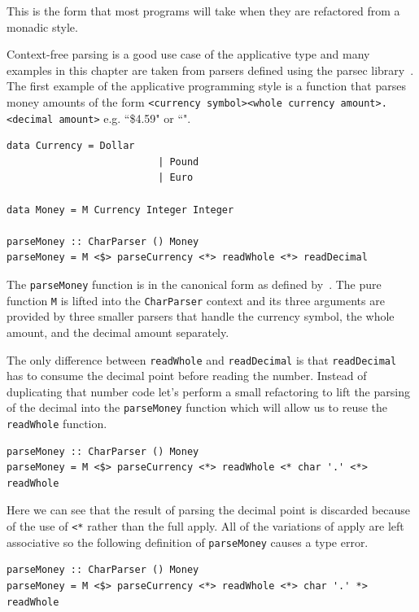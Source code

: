 This is the form that most programs will take when they are refactored from a monadic style. 


 Context-free parsing is a good use case of the applicative type and many examples in this chapter are taken from parsers defined using the parsec library~\citep{parsec}. The first example of the applicative programming style is a function that parses money amounts of the form \texttt{<currency symbol><whole currency amount>.<decimal amount>} e.g. ``\$4.59" or ``".
 
 \begin{lstlisting}[frame=tblr]
 data Currency = Dollar
                          | Pound
                          | Euro
              
data Money = M Currency Integer Integer

parseMoney :: CharParser () Money
parseMoney = M <$> parseCurrency <*> readWhole <*> readDecimal
 \end{lstlisting}
 
The \texttt{parseMoney} function is in the canonical form as defined by~\cite{mcbrideIdioms}. The pure function \texttt{M} is lifted into the \texttt{CharParser} context and its three arguments are provided by three smaller parsers that handle the currency symbol, the whole amount, and the decimal amount separately. 

The only difference between \texttt{readWhole} and \texttt{readDecimal} is that \texttt{readDecimal} has to consume the decimal point before reading the number. Instead of duplicating that number code let's perform a small refactoring to lift the parsing of the decimal into the \texttt{parseMoney} function which will allow us to reuse the \texttt{readWhole} function.

 \begin{lstlisting}[frame=tblr]
parseMoney :: CharParser () Money
parseMoney = M <$> parseCurrency <*> readWhole <* char '.' <*> readWhole
 \end{lstlisting}
 
 Here we can see that the result of parsing the decimal point is discarded because of the use of \texttt{<*} rather than the full apply. All of the variations of apply are left associative so the following definition of \texttt{parseMoney} causes a type error.
 
  \begin{lstlisting}[frame=tblr]
parseMoney :: CharParser () Money
parseMoney = M <$> parseCurrency <*> readWhole <*> char '.' *> readWhole
 \end{lstlisting}
 
